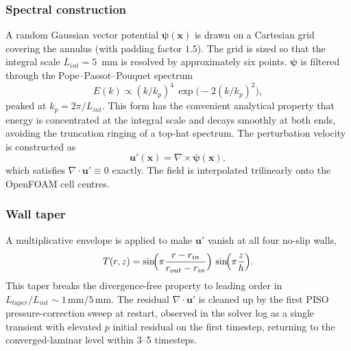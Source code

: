 \documentclass[aps,prl,twocolumn,superscriptaddress]{revtex4-2}
\begin{document}
\subsubsection*{Spectral construction}
A random Gaussian vector potential $\boldsymbol{\psi}(\mathbf{x})$ is
drawn on a Cartesian grid covering the annulus (with padding factor
$1.5$).  The grid is sized so that the integral scale $L_{int} =
5$~mm is resolved by approximately six points.  $\boldsymbol{\psi}$
is filtered through the Pope--Passot--Pouquet spectrum
\begin{equation}
E(k) \propto (k/k_p)^{4}\,\exp\!\bigl(-2(k/k_p)^{2}\bigr),
\label{eq:spec}
\end{equation}
peaked at $k_p = 2\pi/L_{int}$.  This form has the convenient
analytical property that energy is concentrated at the integral
scale and decays smoothly at both ends, avoiding the truncation
ringing of a top-hat spectrum.  The perturbation velocity is
constructed as
\begin{equation}
\mathbf{u}'(\mathbf{x}) = \nabla\!\times\!\boldsymbol{\psi}(\mathbf{x}),
\label{eq:curl}
\end{equation}
which satisfies $\nabla\!\cdot\!\mathbf{u}' \equiv 0$ exactly.  The
field is interpolated trilinearly onto the OpenFOAM cell centres.

\subsubsection*{Wall taper}
A multiplicative envelope is applied to make $\mathbf{u}'$ vanish at
all four no-slip walls,
\begin{equation}
T(r,z) = \sin\!\Bigl(\pi\frac{r-r_{in}}{r_{out}-r_{in}}\Bigr)\,
        \sin\!\Bigl(\pi\frac{z}{h}\Bigr).
\label{eq:taper}
\end{equation}
This taper breaks the divergence-free property to leading order in
$L_{taper}/L_{int}\!\sim\!1\,\mathrm{mm}/5\,\mathrm{mm}$.  The
residual $\nabla\!\cdot\!\mathbf{u}'$ is cleaned up by the first PISO
pressure-correction sweep at restart, observed in the solver log as
a single transient with elevated $p$ initial residual on the first
timestep, returning to the converged-laminar level within 3--5
timesteps.
\end{document}
